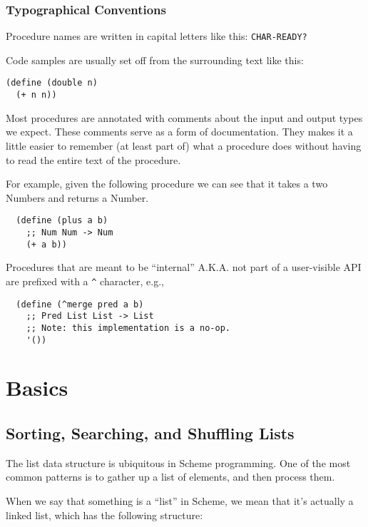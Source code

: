 \documentclass[12pt,openright,draft]{book}
\begin{document}
\section{Typographical Conventions}

Procedure names are written in capital letters like this:
\verb|CHAR-READY?|

Code samples are usually set off from the surrounding text like this:

\begin{verbatim}
(define (double n)
  (+ n n))
\end{verbatim}

Most procedures are annotated with comments about the input and output
types we expect.  These comments serve as a form of documentation.
They makes it a little easier to remember (at least part of) what a
procedure does without having to read the entire text of the
procedure.

For example, given the following procedure we can see that it takes a
two Numbers and returns a Number.

\begin{verbatim}
  (define (plus a b)
    ;; Num Num -> Num
    (+ a b))
\end{verbatim}

Procedures that are meant to be ``internal'' A.K.A. not part of a
user-visible API are prefixed with a \verb|^| character, e.g.,

\begin{verbatim}
  (define (^merge pred a b)
    ;; Pred List List -> List
    ;; Note: this implementation is a no-op.
    '())
\end{verbatim}


\mainmatter{}
\part{Basics}
\chapter{Sorting, Searching, and Shuffling Lists}

The list data structure is ubiquitous in Scheme programming.  One of
the most common patterns is to gather up a list of elements, and
then process them.

When we say that something is a ``list'' in Scheme, we mean that it's
actually a linked list, which has the following structure:
\end{document}
